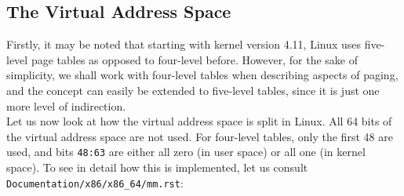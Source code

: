\documentclass[a4paper,10pt]{article}
\begin{document}
\begin{flushleft}

\section{The Virtual Address Space}

Firstly, it may be noted that starting with kernel version 4.11, Linux uses five-level page tables as opposed to four-level before. However,
for the sake of simplicity, we shall work with four-level tables when describing aspects of paging, and the concept can easily be extended
to five-level tables, since it is just one more level of indirection. \\
Let us now look at how the virtual address space is split in Linux. All 64 bits of the virtual address space are not used.
For four-level tables, only the first 48 are used, and bits \verb|48:63| are either all zero (in user space) or all one (in kernel space). To see
in detail how this is implemented, let us consult \verb|Documentation/x86/x86_64/mm.rst|:\\~\\


\end{flushleft}
\end{document}
